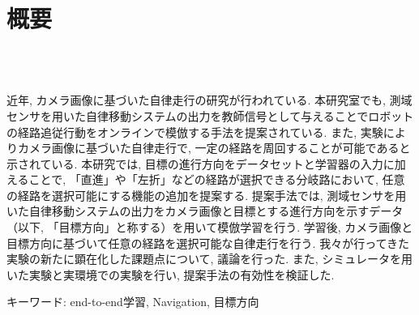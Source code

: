 \chapter*{概要}
\thispagestyle{empty}
%
\begin{center}
  \scalebox{1.5}{視覚と行動のend-to-end学習により}\\
  \scalebox{1.5}{経路追従行動をオンラインで模倣する手法の提案}\\
  \scalebox{1.5}{（目標方向による経路選択機能の追加と検証）}
\end{center}
\vspace{1.0zh}
%
近年, カメラ画像に基づいた自律走行の研究が行われている. 本研究室でも, 測域センサを用いた自律移動システムの出力を教師信号として与えることでロボットの経路追従行動をオンラインで模倣する手法を提案されている. また, 実験によりカメラ画像に基づいた自律走行で, 一定の経路を周回することが可能であると示されている. 本研究では, 目標の進行方向をデータセットと学習器の入力に加えることで, 「直進」や「左折」などの経路が選択できる分岐路において, 任意の経路を選択可能にする機能の追加を提案する. 提案手法では, 測域センサを用いた自律移動システムの出力をカメラ画像と目標とする進行方向を示すデータ（以下, 「目標方向」と称する）を用いて模倣学習を行う. 学習後, カメラ画像と目標方向に基づいて任意の経路を選択可能な自律走行を行う. 
我々が行ってきた実験の新たに顕在化した課題点について, 議論を行った.
また, シミュレータを用いた実験と実環境での実験を行い, 提案手法の有効性を検証した. 

キーワード: end-to-end学習, Navigation, 目標方向
%
\newpage
